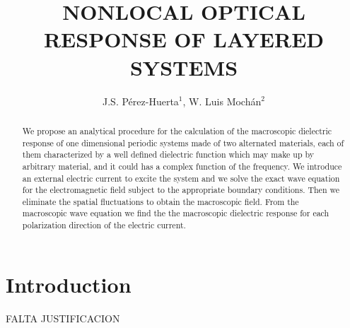 \documentclass{iopart}
\begin{document}
\title{NONLOCAL OPTICAL RESPONSE OF LAYERED SYSTEMS}
\author{J.S. P\'erez-Huerta$^{1}$, W. Luis Moch\'an$^2$}%
\address{$^1$ Unidad
  Académica de Física, Universidad Autónoma de Zacatecas, Calzada
  Solidaridad Esquina con Paseo La Bufa S/N, Zacatecas
  México. \\ $^2$Instituto de Ciencias F\'{\i}sicas, Universidad
  Nacional Aut\'onoma de M\'exico, Apartado Postal 48-3, 62251
  Cuernavaca, Morelos, M\'exico.\\
  E-mail:
  jsph: {\tt jsperez@fisca.uaz.edu.mx}, wlmb: {\tt mochan@fis.unam.mx}}
%

\begin{abstract}
We propose an analytical procedure for the calculation of the
macroscopic dielectric response of one dimensional periodic systems
made of two alternated materials, each of them characterized by a well
defined dielectric function which may make up by arbitrary material,
and it could has a complex function of the frequency. We introduce an
external electric current to excite the system and we solve the exact
wave equation for the electromagnetic field subject to the appropriate
boundary conditions. Then we eliminate the spatial fluctuations to
obtain the macroscopic field. From the macroscopic wave equation we
find the the macroscopic dielectric response for each polarization
direction of the electric current.
\end{abstract}

\section{Introduction}
FALTA JUSTIFICACION


\end{document}
